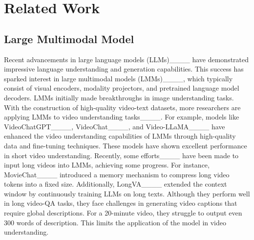 \section{Related Work}
\label{sec:rela_work}
\subsection{Large Multimodal Model}
Recent advancements in large language models (LLMs)____ have demonstrated impressive language understanding and generation capabilities. 
This success has sparked interest in large multimodal models (LMMs)____, which typically consist of visual encoders, modality projectors, and pretrained language model decoders. 
LMMs initially made breakthroughs in image understanding tasks. 
With the construction of high-quality video-text datasets, more researchers are applying LMMs to video understanding tasks____. 
For example, models like VideoChatGPT____, VideoChat____, and Video-LLaMA____ have enhanced the video understanding capabilities of LMMs through high-quality data and fine-tuning techniques.  
These models have shown excellent performance in short video understanding. 
Recently, some efforts____ have been made to input long videos into LMMs, achieving some progress. 
For instance, MovieChat____ introduced a memory mechanism to compress long video tokens into a fixed size. 
Additionally, LongVA____ extended the context window by continuously training LLMs on long texts. 
Although they perform well in long video-QA tasks, they face challenges in generating video captions that require global descriptions. 
For a 20-minute video, they struggle to output even 300 words of description. 
This limits the application of the model in video understanding. 

